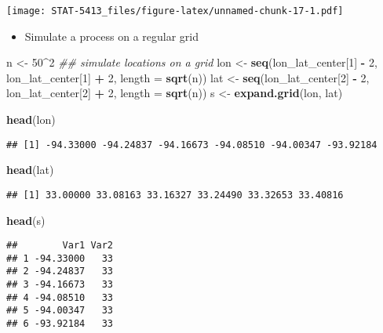 \documentclass[]{book}
\newenvironment{Shaded}{\begin{snugshade}}{\end{snugshade}}
\newcommand{\CommentTok}[1]{\textcolor[rgb]{0.56,0.35,0.01}{\textit{#1}}}
\newcommand{\DataTypeTok}[1]{\textcolor[rgb]{0.13,0.29,0.53}{#1}}
\newcommand{\DecValTok}[1]{\textcolor[rgb]{0.00,0.00,0.81}{#1}}
\newcommand{\KeywordTok}[1]{\textcolor[rgb]{0.13,0.29,0.53}{\textbf{#1}}}
\newcommand{\NormalTok}[1]{#1}
\newcommand{\OperatorTok}[1]{\textcolor[rgb]{0.81,0.36,0.00}{\textbf{#1}}}
\newcommand{\StringTok}[1]{\textcolor[rgb]{0.31,0.60,0.02}{#1}}
\providecommand{\tightlist}{%
  \setlength{\itemsep}{0pt}\setlength{\parskip}{0pt}}
\begin{document}
\texttt{[image: STAT-5413\_files/figure-latex/unnamed-chunk-17-1.pdf]}

\begin{itemize}
\tightlist
\item
  Simulate a process on a regular grid
\end{itemize}

\begin{Shaded}
\begin{Highlighting}[]
\NormalTok{n <-}\StringTok{ }\DecValTok{50}\OperatorTok{^}\DecValTok{2}
\CommentTok{## simulate locations on a grid}
\NormalTok{lon  <-}\StringTok{ }\KeywordTok{seq}\NormalTok{(lon_lat_center[}\DecValTok{1}\NormalTok{] }\OperatorTok{-}\StringTok{ }\DecValTok{2}\NormalTok{, lon_lat_center[}\DecValTok{1}\NormalTok{] }\OperatorTok{+}\StringTok{ }\DecValTok{2}\NormalTok{, }\DataTypeTok{length =} \KeywordTok{sqrt}\NormalTok{(n))}
\NormalTok{lat  <-}\StringTok{ }\KeywordTok{seq}\NormalTok{(lon_lat_center[}\DecValTok{2}\NormalTok{] }\OperatorTok{-}\StringTok{ }\DecValTok{2}\NormalTok{, lon_lat_center[}\DecValTok{2}\NormalTok{] }\OperatorTok{+}\StringTok{ }\DecValTok{2}\NormalTok{, }\DataTypeTok{length =} \KeywordTok{sqrt}\NormalTok{(n))}
\NormalTok{s <-}\StringTok{ }\KeywordTok{expand.grid}\NormalTok{(lon, lat)}

\KeywordTok{head}\NormalTok{(lon)}
\end{Highlighting}
\end{Shaded}

\begin{verbatim}
## [1] -94.33000 -94.24837 -94.16673 -94.08510 -94.00347 -93.92184
\end{verbatim}

\begin{Shaded}
\begin{Highlighting}[]
\KeywordTok{head}\NormalTok{(lat)}
\end{Highlighting}
\end{Shaded}

\begin{verbatim}
## [1] 33.00000 33.08163 33.16327 33.24490 33.32653 33.40816
\end{verbatim}

\begin{Shaded}
\begin{Highlighting}[]
\KeywordTok{head}\NormalTok{(s)}
\end{Highlighting}
\end{Shaded}

\begin{verbatim}
##        Var1 Var2
## 1 -94.33000   33
## 2 -94.24837   33
## 3 -94.16673   33
## 4 -94.08510   33
## 5 -94.00347   33
## 6 -93.92184   33
\end{verbatim}
\end{document}
